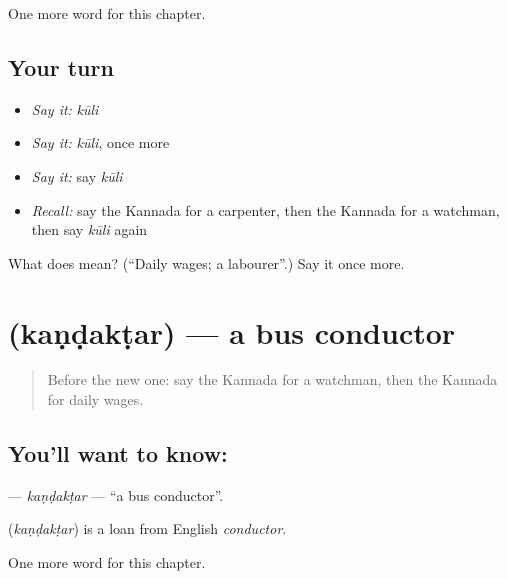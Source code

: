 \begin{grammarlens}[title={What you've built}]
One more word for this chapter.
\end{grammarlens}

\subsection*{Your turn}
\begin{itemize}
\raggedright
  \item \emph{Say it:} \emph{kūli}
  \item \emph{Say it:} \emph{kūli}, once more
  \item \emph{Say it:} say \emph{kūli}
  \item \emph{Recall:} say the Kannada for a carpenter, then the Kannada for a watchman, then say \emph{kūli} again
\end{itemize}

\begin{tcolorbox}[breakable,colback=teal!4,colframe=teal!35!black,title={Before you move on}]
What does  mean? (\textquotedblleft{}Daily wages; a labourer\textquotedblright{}.) Say it once more.
\end{tcolorbox}
\section[\texorpdfstring{\kn{ಕಂಡಕ್ಟರ್} (kaṇḍakṭar)}{ಕಂಡಕ್ಟರ್ (kaṇḍakṭar)}]{ (kaṇḍakṭar) — a bus conductor}

\label{lesson:KA-C197-kandaktar}



\begin{quote}
Before the new one: say the Kannada for a watchman, then the Kannada for daily wages.
\end{quote}

\subsection*{You'll want to know: }
\textbf{} — \emph{kaṇḍakṭar} — \textquotedblleft{}a bus conductor\textquotedblright{}.

\begin{cousinweb}
\textbf{} (\emph{kaṇḍakṭar}) is a loan from English \emph{conductor}.
\end{cousinweb}

\begin{grammarlens}[title={What you've built}]
One more word for this chapter.
\end{grammarlens}

